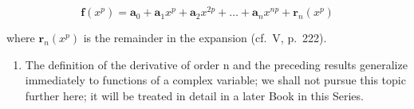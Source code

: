 \[
\mathbf {f} (x ^ {p}) = \mathbf {a} _ {0} + \mathbf {a} _ {1} x ^ {p} + \mathbf {a} _ {2} x ^ {2 p} + \dots + \mathbf {a} _ {n} x ^ {n p} + \mathbf {r} _ {n} (x ^ {p})\tag{13}
\]

where \(\mathbf{r}_{n}(x^{p})\) is the remainder in the expansion (cf.~V, p.~222).

\begin{enumerate}
\def\labelenumi{\arabic{enumi})}
\setcounter{enumi}{2}
\tightlist
\item
  The definition of the derivative of order n and the preceding results generalize immediately to functions of a complex variable; we shall not pursue this topic further here; it will be treated in detail in a later Book in this Series.
\end{enumerate}

